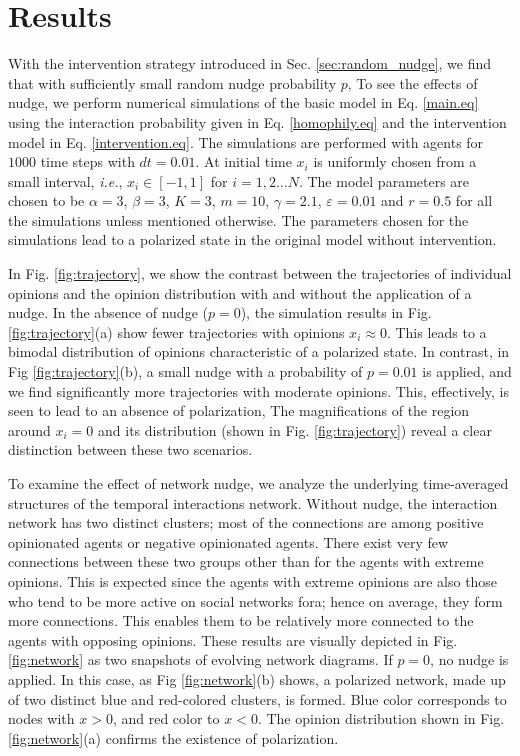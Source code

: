 \documentclass[%
 reprint,
superscriptaddress,
 amsmath,amssymb,
 aps,
 pre,
]{revtex4-1}
\begin{document}
\section{Results}
\label{sec:results}
With the intervention strategy introduced in Sec. \ref{sec:random_nudge}, we find that with sufficiently small random nudge probability $p$,  To see the effects of nudge, we perform numerical simulations of the basic model in Eq. \ref{main.eq} using the interaction probability given in Eq. \ref{homophily.eq} and the intervention model in Eq. \ref{intervention.eq}. The simulations are performed with  agents for $1000$ time steps with $dt=0.01$. At initial time $x_i$ is uniformly chosen from a small interval, {\it i.e.}, $x_i \in [-1,1]$ for $i=1,2 \dots N$. The model parameters are chosen to be $\alpha=3$, $\beta=3$, $K=3$, $m=10$, $\gamma=2.1$, $\varepsilon=0.01$ and $r=0.5$ for all the simulations unless mentioned otherwise. The parameters chosen for the simulations lead to a polarized state in the original model without intervention.


In Fig. \ref{fig:trajectory}, we show the contrast between the trajectories of individual opinions and the opinion distribution with and without the application of a nudge. In the absence of nudge ($p=0$), the simulation results in Fig. \ref{fig:trajectory}(a) show fewer trajectories with opinions $x_i \approx 0$. This leads to a bimodal distribution of opinions characteristic of a polarized state. In contrast, in Fig \ref{fig:trajectory}(b), a small nudge with a probability of $p = 0.01$ is applied, and we find significantly more trajectories with moderate opinions. This, effectively, is seen to lead to an absence of polarization,  The magnifications of the region around $x_i=0$ and its distribution (shown in Fig. \ref{fig:trajectory}) reveal a clear distinction between these two scenarios.

To examine the effect of network nudge, we analyze the underlying time-averaged structures of the temporal interactions network. Without nudge, the interaction network has two distinct clusters; most of the connections are among positive opinionated agents or negative opinionated agents. There exist very few connections between these two groups other than for the agents with extreme opinions.
This is expected since the agents with extreme opinions are also those who tend to be more active on social networks fora; hence on average, they form more connections. This enables them to be relatively more connected to the agents with opposing opinions. These results are visually depicted in Fig. \ref{fig:network} as two snapshots of evolving network diagrams. If $p=0$, no nudge is applied. In this case, as Fig \ref{fig:network}(b) shows, a polarized network, made up of two distinct blue and red-colored clusters, is formed. Blue color corresponds to nodes with $x > 0$, and red color to $x< 0$. The opinion distribution shown in Fig. \ref{fig:network}(a) confirms the existence of polarization.
\end{document}
